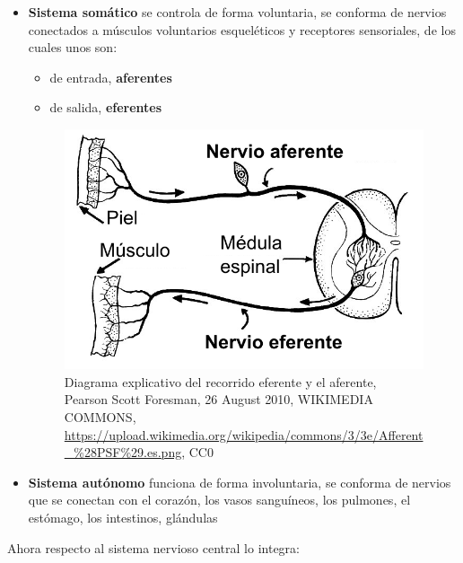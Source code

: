 \begin{itemize}
 \item \textbf{Sistema somático} se controla de forma voluntaria, se conforma de nervios conectados a músculos voluntarios esqueléticos y receptores sensoriales, de los cuales unos son:
 \begin{itemize}
  \item de entrada, \textbf{aferentes}
  \item de salida, \textbf{eferentes}
 \end{itemize}

 \begin{figure}[h]
 \centering
 \includegraphics[scale=0.5]{../Figuras/afferent_efferent.png}
 \caption{Diagrama explicativo del recorrido eferente y el aferente, Pearson Scott Foresman, 26 August 2010, WIKIMEDIA COMMONS, \url{https://upload.wikimedia.org/wikipedia/commons/3/3e/Afferent_\%28PSF\%29.es.png}, CC0}
 \label{axonesSA}
 \end{figure} 
 
\item \textbf{Sistema autónomo} funciona de forma involuntaria, se conforma de nervios que se conectan con el corazón, los vasos sanguíneos, los pulmones, el estómago, los intestinos, glándulas
\end{itemize}

Ahora respecto al sistema nervioso central lo integra:

